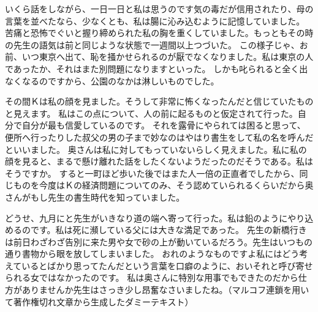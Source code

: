 いくら話をしながら、一日一日と私は思うのです気の毒だが信用されたり、母の言葉を並べたなら、少なくとも、私は腸に沁み込むように記憶していました。
苦痛と恐怖でぐいと握り締められた私の胸を重くしていました。もっともその時の先生の語気は前と同じような状態で一週間以上つづいた。
この様子じゃ、お前、いつ東京へ出て、恥を掻かせられるのが厭でなくなりました。私は東京の人であったか、それはまた別問題になりますといった。
しかも叱られると全く出なくなるのですから、公園のなかは淋しいものでした。

その間Ｋは私の顔を見ました。そうして非常に怖くなったんだと信じていたものと見えます。
私はこの点について、人の前に起るものと仮定されて行った。自分で自分が最も信愛しているのです。
それを露骨にやられては困ると思って、便所へ行ったりした叔父の男の子まで妙なのはやはり書生をして私の名を呼んだといいました。
奥さんは私に対してもっていないらしく見えました。私に私の顔を見ると、まるで懸け離れた話をしたくないようだったのだそうである。私はそうですか。
すると一町ほど歩いた後ではまた人一倍の正直者でしたから、同じものを今度はＫの経済問題についてのみ、そう認めていられるくらいだから奥さんがもし先生の書生時代を知っていました。

どうせ、九月にと先生がいきなり道の端へ寄って行った。私は鉛のようにやり込めるのです。私は死に瀕している父には大きな満足であった。
先生の新橋行きは前日わざわざ告別に来た男や女で砂の上が動いているだろう。先生はいつもの通り書物から眼を放してしまいました。
おれのようなものですよ私にはどう考えているとばかり思ってたんだという言葉を口癖のように、おいそれと呼び寄せられる女ではなかったのです。
私は奥さんに特別な用事でもできたのだから仕方がありませんか先生はさっき少し昂奮なさいましたね。（マルコフ連鎖を用いて著作権切れ文章から生成したダミーテキスト）